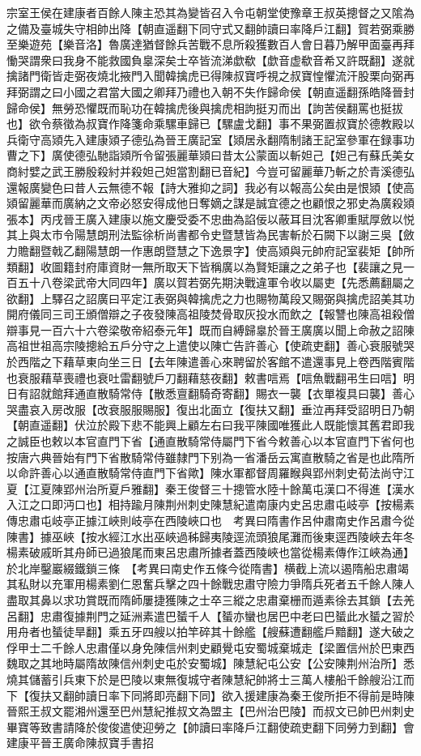 宗室王侯在建康者百餘人陳主恐其為變皆召入令屯朝堂使豫章王叔英摠督之又隂為之備及臺城失守相帥出降【朝直遥翻下同守式又翻帥讀曰率降戶江翻】賀若弼乘勝至樂遊苑【樂音洛】魯廣達猶督餘兵苦戰不息所殺獲數百人會日暮乃解甲面臺再拜慟哭謂衆曰我身不能救國負辠深矣士卒皆流涕歔欷【歔音虚欷音希又許既翻】遂就擒諸門衛皆走弼夜燒北掖門入聞韓擒虎已得陳叔寶呼視之叔寶惶懼流汗股栗向弼再拜弼謂之曰小國之君當大國之卿拜乃禮也入朝不失作歸命侯【朝直遥翻孫皓降晉封歸命侯】無勞恐懼既而恥功在韓擒虎後與擒虎相訽挺刃而出【訽苦侯翻罵也挺拔也】欲令蔡徵為叔寶作降箋命乘騾車歸已【騾盧戈翻】事不果弼置叔寶於德教殿以兵衛守高熲先入建康熲子德弘為晉王廣記室【熲居永翻隋制諸王記室參軍在録事功曹之下】廣使德弘馳詣熲所令留張麗華熲曰昔太公蒙面以斬妲己【妲己有蘇氏美女商紂嬖之武王勝殷殺紂并殺妲己妲當割翻已音紀】今豈可留麗華乃斬之於青溪德弘還報廣變色曰昔人云無德不報【詩大雅抑之詞】我必有以報高公矣由是恨熲【使高熲留麗華而廣納之文帝必怒安得成他日奪嫡之謀是誠宜德之也顧恨之邪史為廣殺熲張本】丙戌晉王廣入建康以施文慶受委不忠曲為諂佞以蔽耳目沈客卿重賦厚斂以悦其上與太市令陽慧朗刑法監徐析尚書都令史暨慧皆為民害斬於石闕下以謝三吳【斂力贍翻暨戟乙翻陽慧朗一作惠朗暨慧之下逸景字】使高熲與元帥府記室裴矩【帥所類翻】收圖籍封府庫資財一無所取天下皆稱廣以為賢矩讓之之弟子也【裴讓之見一百五十八卷梁武帝大同四年】廣以賀若弼先期決戰違軍令收以屬吏【先悉薦翻屬之欲翻】上驛召之詔廣曰平定江表弼與韓擒虎之力也賜物萬段又賜弼與擒虎詔美其功開府儀同三司王頒僧辯之子夜發陳高祖陵焚骨取灰投水而飲之【報讐也陳高祖殺僧辯事見一百六十六卷梁敬帝紹泰元年】既而自縛歸辠於晉王廣廣以聞上命赦之詔陳高祖世祖高宗陵摠給五戶分守之上遣使以陳亡告許善心【使疏吏翻】善心衰服號哭於西階之下藉草東向坐三日【去年陳遣善心來聘留於客館不遣還事見上卷西階賓階也衰服藉草喪禮也衰吐雷翻號戶刀翻藉慈夜翻】敕書唁焉【唁魚戰翻弔生曰唁】明日有詔就館拜通直散騎常侍【散悉亶翻騎奇寄翻】賜衣一襲【衣單複具曰襲】善心哭盡哀入房改服【改衰服服賜服】復出北面立【復扶又翻】垂泣再拜受詔明日乃朝【朝直遥翻】伏泣於殿下悲不能興上顧左右曰我平陳國唯獲此人既能懷其舊君即我之誠臣也敕以本官直門下省【通直散騎常侍屬門下省今敕善心以本官直門下省何也按唐六典晉始有門下省散騎常侍雖隸門下别為一省潘岳云寓直散騎之省是也此隋所以命許善心以通直散騎常侍直門下省歟】陳水軍都督周羅睺與郢州刺史荀法尚守江夏【江夏陳郢州治所夏戶雅翻】秦王俊督三十摠管水陸十餘萬屯漢口不得進【漢水入江之口即沔口也】相持踰月陳荆州刺史陳慧紀遣南康内史呂忠肅屯岐亭【按楊素傳忠肅屯岐亭正據江峽則岐亭在西陵峽口也　考異曰隋書作呂仲肅南史作呂肅今從陳書】據巫峽【按水經江水出巫峽過秭歸夷陵逕流頭狼尾灘而後東逕西陵峽去年冬楊素破戚昕其舟師已過狼尾而東呂忠肅所據者蓋西陵峽也當從楊素傳作江峽為通】於北岸鑿巖綴鐵鎖三條　【考異曰南史作五條今從隋書】横截上流以遏隋船忠肅竭其私財以充軍用楊素劉仁恩奮兵擊之四十餘戰忠肅守險力爭隋兵死者五千餘人陳人盡取其鼻以求功賞既而隋師屢捷獲陳之士卒三縱之忠肅棄栅而遁素徐去其鎖【去羌呂翻】忠肅復據荆門之延洲素遣巴蜑千人【蜑亦蠻也居巴中老曰巴蜑此水蜑之習於用舟者也蜑徒旱翻】乘五牙四艘以拍竿碎其十餘艦【艘蘇遭翻艦戶黯翻】遂大破之俘甲士二千餘人忠肅僅以身免陳信州刺史顧覺屯安蜀城棄城走【梁置信州於巴東西魏取之其地時屬隋故陳信州刺史屯於安蜀城】陳慧紀屯公安【公安陳荆州治所】悉燒其儲蓄引兵東下於是巴陵以東無復城守者陳慧紀帥將士三萬人樓船千餘艘沿江而下【復扶又翻帥讀日率下同將即亮翻下同】欲入援建康為秦王俊所拒不得前是時陳晉熙王叔文罷湘州還至巴州慧紀推叔文為盟主【巴州治巴陵】而叔文已帥巴州刺史畢寶等致書請降於俊俊遣使迎勞之【帥讀曰率降戶江翻使疏吏翻下同勞力到翻】會建康平晉王廣命陳叔寶手書招